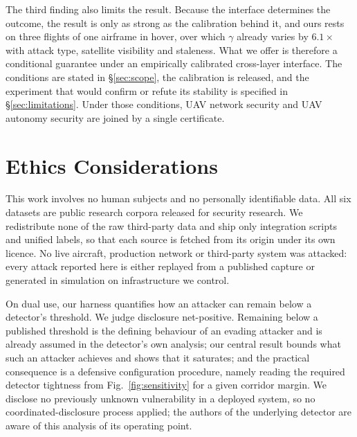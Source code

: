 The third finding also limits the result. Because the interface determines the
outcome, the result is only as strong as the calibration behind it, and ours
rests on three flights of one airframe in hover, over which $\gamma$ already
varies by $6.1\times$ with attack type, satellite visibility and staleness. What
we offer is therefore a conditional guarantee under an empirically calibrated
cross-layer interface. The conditions are stated in \S\ref{sec:scope}, the
calibration is released, and the experiment that would confirm or refute its
stability is specified in \S\ref{sec:limitations}. Under those conditions, UAV
network security and UAV autonomy security are joined by a single certificate.

\section{Ethics Considerations}
\label{sec:ethics}
This work involves no human subjects and no personally identifiable data. All
six datasets are public research corpora released for security research. We
redistribute none of the raw third-party data and ship only integration scripts
and unified labels, so that each source is fetched from its origin under its own
licence. No live aircraft, production network or third-party system was
attacked: every attack reported here is either replayed from a published capture
or generated in simulation on infrastructure we control.

On dual use, our harness quantifies how an attacker can remain below a
detector's threshold. We judge disclosure net-positive. Remaining below a
published threshold is the defining behaviour of an evading attacker and is
already assumed in the detector's own analysis; our central result bounds what
such an attacker achieves and shows that it saturates; and the practical
consequence is a defensive configuration procedure, namely reading the required
detector tightness from Fig.~\ref{fig:sensitivity} for a given corridor margin.
We disclose no previously unknown vulnerability in a deployed system, so no
coordinated-disclosure process applied; the authors of the underlying detector
are aware of this analysis of its operating point.

